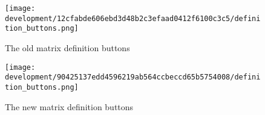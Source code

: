 \documentclass[../development.tex]{subfiles}
\begin{document}
\begin{figure}[H]
	\hspace{0.08\linewidth}
	\begin{minipage}{0.35\linewidth}
		\centering
		\texttt{[image: development/12cfabde606ebd3d48b2c3efaad0412f6100c3c5/definition\_buttons.png]}
		\caption{The old matrix definition buttons}
		\label{fig:development:12cfabde606ebd3d48b2c3efaad0412f6100c3c5:definition_buttons.png}
	\end{minipage}\hfill
	\begin{minipage}{0.35\linewidth}
		\centering
		\texttt{[image: development/90425137edd4596219ab564ccbeccd65b5754008/definition\_buttons.png]}
		\caption{The new matrix definition buttons}
		\label{fig:development:90425137edd4596219ab564ccbeccd65b5754008:definition_buttons.png}
	\end{minipage}
	\hspace{0.08\linewidth}
\end{figure}
\end{document}
